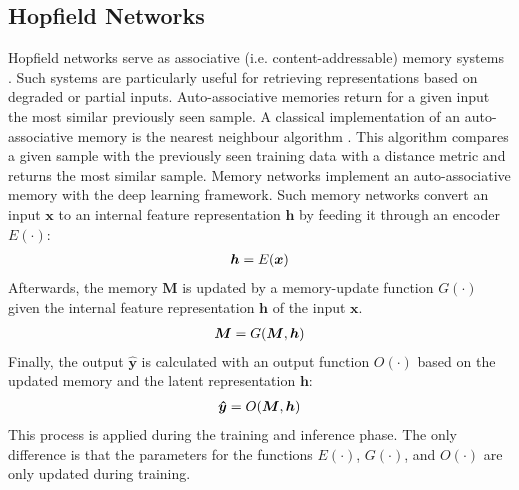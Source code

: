 \subsection{Hopfield Networks}
Hopfield networks serve as associative (i.e. content-addressable) memory systems .
Such systems are particularly useful for retrieving representations based on degraded or partial inputs.
Auto-associative memories return for a given input the most similar previously seen sample.
A classical implementation of an auto-associative memory is the nearest neighbour algorithm .
This algorithm compares a given sample with the previously seen training data with a distance metric and returns the most similar sample.
Memory networks  implement an auto-associative memory with the deep learning framework.
Such memory networks convert an input \(\boldsymbol{x}\) to an internal feature representation $\boldsymbol{h}$ by feeding it through an encoder \(E(\cdot)\):
%
\begin{align}\eqlbl{hf_000}
	\boldsymbol{h}=E(\boldsymbol{x})
\end{align}
%
Afterwards, the memory $\boldsymbol{M}$ is updated by a memory-update function $G(\cdot)$ given the internal feature representation $\boldsymbol{h}$ of the input \(\boldsymbol{x}\).
%
\begin{align}\eqlbl{hf_0}
	\boldsymbol{M}=G(\boldsymbol{M}, \boldsymbol{h})
\end{align}
%
Finally, the output $\boldsymbol{\hat{y}}$ is calculated with an output function $O(\cdot)$ based on the updated memory and the latent representation $\boldsymbol{h}$:
%
\begin{align}\eqlbl{hf_00}
	\boldsymbol{\hat{y}}=O(\boldsymbol{M}, \boldsymbol{h})
\end{align}
%
This process is applied during the training and inference phase.
The only difference is that the parameters for the functions \(E(\cdot)\), \(G(\cdot)\), and \(O(\cdot)\) are only updated during training.


